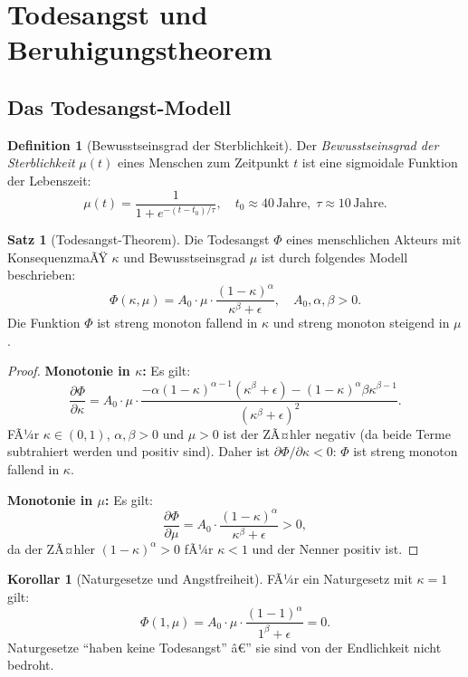 ﻿\documentclass[a4paper,12pt]{article}
\theoremstyle{definition}
\newtheorem{definition}{Definition}
\newtheorem{satz}{Satz}
\newtheorem{korollar}{Korollar}
\begin{document}
\section{Todesangst und Beruhigungstheorem}

\subsection{Das Todesangst-Modell}

\begin{definition}[Bewusstseinsgrad der Sterblichkeit]
Der \emph{Bewusstseinsgrad der Sterblichkeit} $\mu(t)$ eines Menschen zum Zeitpunkt $t$ ist eine sigmoidale Funktion der Lebenszeit:
\[
\mu(t) = \frac{1}{1 + e^{-(t - t_0)/\tau}}, \quad t_0 \approx 40\,\text{Jahre}, \; \tau \approx 10\,\text{Jahre}.
\]
\end{definition}

\begin{satz}[Todesangst-Theorem]
\label{satz:angst}
Die Todesangst $\Phi$ eines menschlichen Akteurs mit KonsequenzmaÃŸ $\kappa$ und Bewusstseinsgrad $\mu$ ist durch folgendes Modell beschrieben:
\[
\Phi(\kappa, \mu) = A_0 \cdot \mu \cdot \frac{(1 - \kappa)^{\alpha}}{\kappa^{\beta} + \epsilon}, \quad A_0, \alpha, \beta > 0.
\]
Die Funktion $\Phi$ ist streng monoton fallend in $\kappa$ und streng monoton steigend in $\mu$.
\end{satz}

\begin{proof}
\textbf{Monotonie in $\kappa$:} Es gilt:
\[
\frac{\partial \Phi}{\partial \kappa} = A_0 \cdot \mu \cdot \frac{-\alpha(1-\kappa)^{\alpha-1}(\kappa^\beta + \epsilon) - (1-\kappa)^\alpha \beta \kappa^{\beta-1}}{(\kappa^\beta + \epsilon)^2}.
\]
FÃ¼r $\kappa \in (0,1)$, $\alpha, \beta > 0$ und $\mu > 0$ ist der ZÃ¤hler negativ (da beide Terme subtrahiert werden und positiv sind). Daher ist $\partial \Phi / \partial \kappa < 0$: $\Phi$ ist streng monoton fallend in $\kappa$.

\textbf{Monotonie in $\mu$:} Es gilt:
\[
\frac{\partial \Phi}{\partial \mu} = A_0 \cdot \frac{(1-\kappa)^{\alpha}}{\kappa^{\beta} + \epsilon} > 0,
\]
da der ZÃ¤hler $(1-\kappa)^\alpha > 0$ fÃ¼r $\kappa < 1$ und der Nenner positiv ist. \qedhere
\end{proof}

\begin{korollar}[Naturgesetze und Angstfreiheit]
\label{kor:nl_angstfrei}
FÃ¼r ein Naturgesetz mit $\kappa = 1$ gilt:
\[
\Phi(1, \mu) = A_0 \cdot \mu \cdot \frac{(1 - 1)^{\alpha}}{1^{\beta} + \epsilon} = 0.
\]
Naturgesetze ``haben keine Todesangst'' â€” sie sind von der Endlichkeit nicht bedroht.
\end{korollar}
\end{document}
